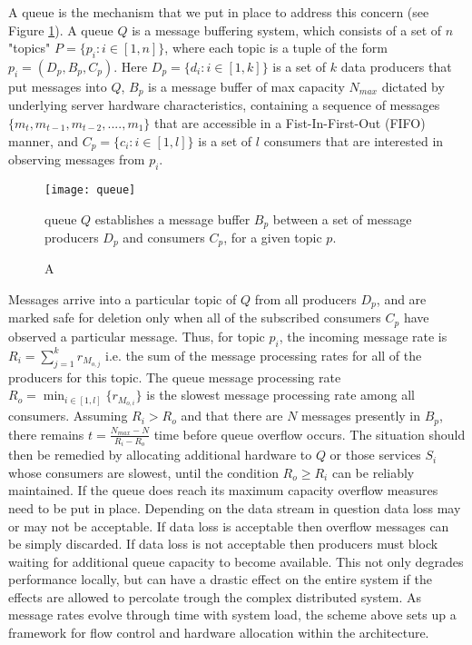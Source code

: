 A queue is the mechanism that we put in place to address this concern (see Figure \ref{fig:queue}). A queue $Q$ is a message buffering system, which consists of a set of $n$ "topics" $P = \{p_i: i \in [1,n]\}$, where each topic is a tuple of the form $p_i = (D_p,B_p,C_p)$. Here $D_p = \{d_i: i\in [1,k]\}$ is a set of $k$ data producers that put messages into $Q$, $B_p$ is a message buffer of max capacity $N_{max}$ dictated by underlying server hardware characteristics, containing a sequence of messages $\{m_t, m_{t-1},m_{t-2},....,m_1\}$ that are accessible in a Fist-In-First-Out (FIFO) manner, and $C_p = \{c_i: i \in [1,l]\}$ is a set of $l$ consumers that are interested in observing messages from $p_i$.

\begin{figure}[H]
\texttt{[image: queue]}
\caption A queue $Q$ establishes a message buffer $B_p$ between a set of message producers $D_p$ and consumers $C_p$, for a given topic $p$.
\label{fig:queue}
\end{figure}

Messages arrive into a particular topic of $Q$ from all producers $D_p$, and are marked safe for deletion only when all of the subscribed consumers $C_p$ have observed a particular message. Thus, for topic $p_i$, the incoming message rate is $\displaystyle R_i = \sum_{j=1}^k r_{M_{o,j}}$ i.e. the sum of the message processing rates for all of the producers for this topic. The queue message processing rate $\displaystyle R_o = \min_{i \in [1,l]}\{r_{M_{o,i}}\}$ is the slowest message processing rate among all consumers. Assuming $R_i > R_o$ and that there are $N$ messages presently in $B_p$, there remains $t = \frac{N_{max} - N} {R_i - R_o}$ time before queue overflow occurs. The situation should then be remedied by allocating additional hardware to $Q$ or those services $S_i$ whose consumers are slowest, until the condition $R_o \ge R_i$ can be reliably maintained. If the queue does reach its maximum capacity overflow measures need to be put in place. Depending on the data stream in question data loss may or may not be acceptable. If data loss is acceptable then overflow messages can be simply discarded. If data loss is not acceptable then producers must block waiting for additional queue capacity to become available. This not only degrades performance locally, but can have a drastic effect on the entire system if the effects are allowed to percolate trough the complex distributed system. As message rates evolve through time with system load, the scheme above sets up a framework for flow control and hardware allocation within the architecture.

